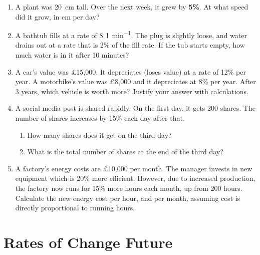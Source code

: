 \documentclass[12pt]{article}
\begin{document}
\begin{enumerate}[resume]

    \item A plant was \SI{20}{\centi\meter} tall. Over the next week, it grew by \textbf{5\%}. At what speed did it grow, in cm per day?
\vspace{0.6cm}
    \item A bathtub fills at a rate of \SI{8}{\litre\per\minute}. The plug is slightly loose, and water drains out at a rate that is 2\% of the fill rate. If the tub starts empty, how much water is in it after 10 minutes?
\vspace{0.6cm}
    \item A car's value was \pounds 15,000. It depreciates (loses value) at a rate of 12\% per year. A motorbike's value was \pounds 8,000 and it depreciates at 8\% per year. After 3 years, which vehicle is worth more? Justify your answer with calculations.
\vspace{0.6cm}
    \item A social media post is shared rapidly. On the first day, it gets 200 shares. The number of shares increases by 15\% each day after that.
    \begin{enumerate}
        \item How many shares does it get on the third day?
        \item What is the total number of shares at the end of the third day?
    \end{enumerate}
\vspace{0.6cm}
    \item A factory's energy costs are \pounds 10,000 per month. The manager invests in new equipment which is 20\% more efficient. However, due to increased production, the factory now runs for 15\% more hours each month, up from 200 hours. Calculate the new energy cost per hour, and per month, assuming cost is directly proportional to running hours.

\end{enumerate}

\section*{Rates of Change Future}
\end{document}
